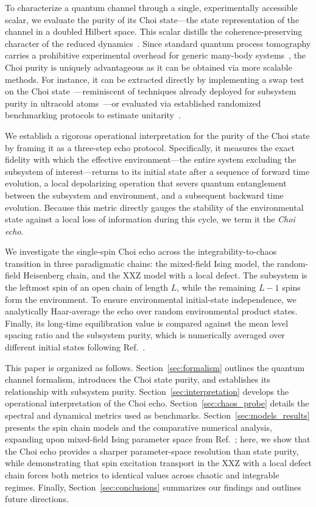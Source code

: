 \documentclass[pra,twocolumn,aps,showpacs,superscriptaddress,longbibliography]{revtex4-2}%
\begin{document}
To characterize a quantum channel through a single, experimentally accessible scalar, we evaluate the purity of its Choi state---the state representation of the channel in a doubled Hilbert space. This scalar distills the coherence-preserving character of the reduced dynamics~\cite{wallman_2015_estimating}. Since standard quantum process tomography carries a prohibitive experimental overhead for generic many-body systems~\cite{huang_2020_predicting}, the Choi purity is uniquely advantageous as it can be obtained via more scalable methods. For instance, it can be extracted directly by implementing a swap test on the Choi state~\cite{rosgen_2010_testing,yuan_2021_universal}---reminiscent of techniques already deployed for subsystem purity in ultracold atoms~\cite{islam_2015_measuring, kaufman_2016_quantum}---or evaluated via established randomized benchmarking protocols to estimate unitarity~\cite{wallman_2015_estimating}.

We establish a rigorous operational interpretation for the purity of the Choi state by framing it as a three-step echo protocol. Specifically, it measures the exact fidelity with which the effective environment---the entire system excluding the subsystem of interest---returns to its initial state after a sequence of forward time evolution, a local depolarizing operation that severs quantum entanglement between the subsystem and environment, and a subsequent backward time evolution. Because this metric directly gauges the stability of the environmental state against a local loss of information during this cycle, we term it the \textit{Choi echo}.

We investigate the single-spin Choi echo across the integrability-to-chaos transition in three paradigmatic chains: the mixed-field Ising model, the random-field Heisenberg chain, and the XXZ model with a local defect. The subsystem is the leftmost spin of an open chain of length $L$, while the remaining $L-1$ spins form the environment. To ensure environmental initial-state independence, we analytically Haar-average the echo over random environmental product states. Finally, its long-time equilibration value is compared against the mean level spacing ratio and the subsystem purity, which is numerically averaged over different initial states following Ref.~\cite{mirkin_2021_quantum}.

This paper is organized as follows. Section~\ref{sec:formalism} outlines the quantum channel formalism, introduces the Choi state purity, and establishes its relationship with subsystem purity. Section~\ref{sec:interpretation} develops the operational interpretation of the Choi echo. Section~\ref{sec:chaos_probe} details the spectral and dynamical metrics used as benchmarks. Section~\ref{sec:models_results} presents the spin chain models and the comparative numerical analysis, expanding upon mixed-field Ising parameter space from Ref.~\cite{mirkin_2021_quantum}; here, we show that the Choi echo provides a sharper parameter-space resolution than state purity, while demonstrating that spin excitation transport in the XXZ with a local defect chain forces both metrics to identical values across chaotic and integrable regimes. Finally, Section~\ref{sec:conclusions} summarizes our findings and outlines future directions.
\end{document}
